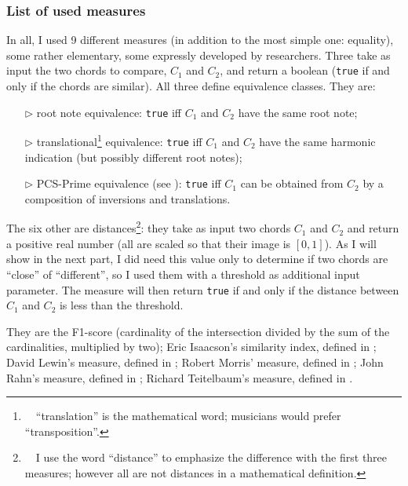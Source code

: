 \documentclass[a4paper,10pt]{article}
\newcommand{\guill}[1]{``#1''}
\begin{document}
\subsubsection{List of used measures}

In all, I used 9 different measures (in addition to the most simple one: equality), some rather elementary, some expressly developed by researchers. Three take as input the two chords to compare, $C_1$ and $C_2$, and return a boolean (\texttt{true} if and only if the chords are similar). All three define equivalence classes. They are:

\begin{itemize}
\itemsep0em 
\item[$\triangleright$] root note equivalence: \texttt{true} iff $C_1$ and $C_2$ have the same root note;
\item[$\triangleright$] translational\footnote{~~\guill{translation} is the mathematical word; musicians would prefer \guill{transposition}.} 
equivalence: \texttt{true} iff $C_1$ and $C_2$ have the same harmonic indication (but possibly different root notes);
\item[$\triangleright$] PCS-Prime equivalence (see \cite{forte}): \texttt{true} iff $C_1$ can be obtained from $C_2$ by a composition of inversions and translations.
\end{itemize}

The six other are distances\footnote{~~I use the word \guill{distance} to emphasize the difference with the first three measures; however all are not distances in a mathematical definition.}: they take as input two chords $C_1$ and $C_2$ and return a positive real number (all are scaled so that their image is $[0,1]$). As I will show in the next part, I did need this value only to determine if two chords are \guill{close} of \guill{different}, so I used them with a threshold as additional input parameter. The measure will then return \texttt{true} if and only if the distance between $C_1$ and $C_2$ is less than the threshold.

They are the F1-score (cardinality of the intersection divided by the sum of the cardinalities, multiplied by two); Eric Isaacson's similarity index, defined in \cite{isaacson}; David Lewin's measure, defined in \cite{lewin}; Robert Morris' measure, defined in \cite{morris}; John Rahn's measure, defined in \cite{rahn}; Richard Teitelbaum's measure, defined in \cite{teitelbaum}.
\end{document}
